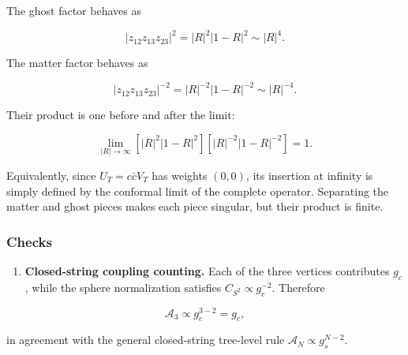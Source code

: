 \documentclass[
  10pt,
  a4paper,
  openany]{book}
\providecommand{\tightlist}{%
  \setlength{\itemsep}{0pt}\setlength{\parskip}{0pt}}
\begin{document}
The ghost factor behaves as

\[
|z_{12}z_{13}z_{23}|^2
=|R|^2|1-R|^2
\sim|R|^4.
\]

The matter factor behaves as

\[
|z_{12}z_{13}z_{23}|^{-2}
=|R|^{-2}|1-R|^{-2}
\sim|R|^{-4}.
\]

Their product is one before and after the limit:

\[
\lim_{|R|\to\infty}
\left[|R|^2|1-R|^2\right]
\left[|R|^{-2}|1-R|^{-2}\right]
=1.
\]

Equivalently, since \(U_T=c\bar cV_T\) has weights \((0,0)\), its
insertion at infinity is simply defined by the conformal limit of the
complete operator. Separating the matter and ghost pieces makes each
piece singular, but their product is finite.

\subsubsection{Checks}\label{checks-27}

\begin{enumerate}
\def\labelenumi{\arabic{enumi}.}
\tightlist
\item
  \textbf{Closed-string coupling counting.} Each of the three vertices
  contributes \(g_c\), while the sphere normalization satisfies
  \(C_{S^2}\propto g_c^{-2}\). Therefore
\end{enumerate}

\[
\mathcal A_3\propto g_c^{3-2}=g_c,
\]

in agreement with the general closed-string tree-level rule
\(\mathcal A_N\propto g_s^{N-2}\).
\end{document}
